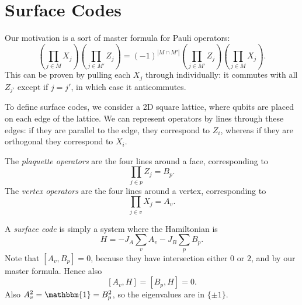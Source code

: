 \documentclass[12pt]{article}
\begin{document}
\newpage

\section{Surface Codes}%
\label{sec:sc}

Our motivation is a sort of master formula for Pauli operators:
\[
\left( \prod_{j \in M} X_j \right) \left( \prod_{j \in M'} Z_j \right) = (-1)^{|M \cap M'|} \left( \prod_{j \in M'}Z_j \right) \left( \prod_{j \in M} X_j \right).
\]
This can be proven by pulling each $X_j$ through individually: it commutes with all $Z_{j'}$ except if $j = j'$, in which case it anticommutes.

To define surface codes, we consider a 2D square lattice, where qubits are placed on each edge of the lattice. We can represent operators by lines through these edges: if they are parallel to the edge, they correspond to $Z_i$, whereas if they are orthogonal they correspond to $X_i$.


The \emph{plaquette operators} are the four lines around a face, corresponding to
\[
\prod_{j \in p} Z_j = B_p.
\]
The \emph{vertex operators} are the four lines around a vertex, corresponding to
\[
\prod_{j \in v} X_j = A_v.
\]

A \emph{surface code} is simply a system where the Hamiltonian is
\[
H = - J_A \sum_v A_v - J_B \sum_p B_p.
\]
Note that $[A_v, B_p] = 0$, because they have intersection either $0$ or $2$, and by our master formula. Hence also
\[
	[A_v, H] = [B_p, H] = 0.
\]
Also $A_v^2 = \mathbbm{1} = B_p^2$, so the eigenvalues are in $\{\pm 1\}$.
\end{document}
